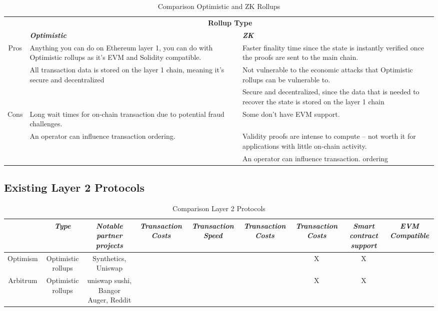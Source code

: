 \begin{table}[htbp]
\caption{Comparison Optimistic and ZK Rollups}
\begin{center}
\begin{tabular}{|c|p{3.5cm}|p{3.5cm}|}
\hline
\textbf{}&\multicolumn{2}{|c|}{\textbf{Rollup Type}} \\
\cline{2-3} 
\textbf{} & \textbf{\textit{Optimistic}}& \textbf{\textit{ZK}} \\
\hline
Pros 
& Anything you can do on Ethereum layer 1, you can do with Optimistic rollups as it's EVM and Solidity compatible. & Faster finality time since the state is instantly verified once the proofs are sent to the main chain. \\
& All transaction data is stored on the layer 1 chain, meaning it's secure and decentralized   & Not vulnerable to the economic attacks that Optimistic rollups can be vulnerable to. \\
&   & Secure and decentralized, since the data that is needed to recover the state is stored on the layer 1 chain \\

Cons 
& Long wait times for on-chain transaction due to potential fraud challenges. & Some don't have EVM support.  \\
& An operator can influence transaction ordering. & Validity proofs are intense to compute – not worth it for applications with little on-chain activity. \\
&  & An operator can influence transaction. ordering  \\
\hline
\end{tabular}
\label{tab:comparison:rollups}
\end{center}
\end{table}


\subsection{Existing Layer 2 Protocols}

\begin{table}[htbp]
\caption{Comparison Layer 2 Protocols}
\begin{center}
\begin{tabular}{|c|c|c|c|c|c|c|c|c}
\hline
\cline{2-3} 
\textbf{} & \textbf{\textit{Type}}& \textbf{\textit{Notable partner projects}} & \textbf{\textit{Transaction Costs}}  & \textbf{\textit{Transaction Speed}} & \textbf{\textit{Transaction Costs}} & \textbf{\textit{Transaction Costs}} & \textbf{\textit{Smart contract support }} & \textbf{\textit{EVM Compatible}} \\
\hline
Optimism & Optimistic rollups  & Synthetics, Uniswap  & & & &X  & X \\
Arbitrum & Optimistic rollups  & uniswap sushi, Bangor Auger, Reddit  & & & &X & X\\

\hline
\end{tabular}
\label{tab:comparison:layer2}
\end{center}
\end{table}



